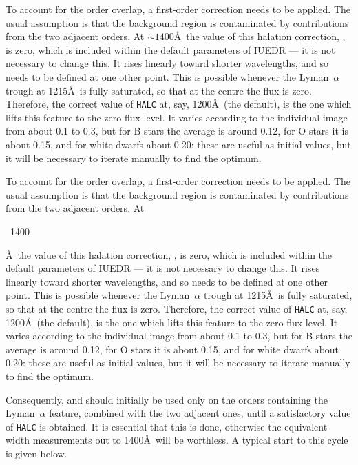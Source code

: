 \begin{latexonly}
To account for the order overlap, a first-order correction needs to be applied.
The usual assumption is that the background region is contaminated by
contributions from the two adjacent orders. At $\sim 1400$\AA\ the value of
this halation correction, , is zero, which is 
included within the
default parameters of IUEDR --- it is not necessary to change this.
It rises linearly toward shorter wavelengths, and so needs to be defined at
one other point.  This is possible whenever the Lyman~$\alpha$ trough at
1215\AA\ is fully saturated, so that at the centre the flux is zero.
Therefore, the correct value of \verb+HALC+ at, say, 1200\AA\ (the default),
is the one which lifts this feature to the zero flux level. It varies
according to the individual image from about 0.1 to 0.3, but for B stars the
average is around 0.12, for O stars it is about 0.15, and for white dwarfs
about 0.20: these are useful as initial values, but it will be necessary to
iterate manually to find the optimum.
\end{latexonly}

\begin{htmlonly}
To account for the order overlap, a first-order correction needs to be applied.
The usual assumption is that the background region is contaminated by
contributions from the two adjacent orders. At
\begin{rawhtml}~1400\end{rawhtml}\AA\ the value of this halation correction,
, 
is zero, which is included within the default parameters of IUEDR
--- it is not necessary to change this. It rises linearly toward shorter
wavelengths, and so needs to be defined at one other point.  This is possible
whenever the Lyman~$\alpha$ trough at 1215\AA\ is fully saturated, so that at
the centre the flux is zero. Therefore, the correct value of \verb+HALC+ at,
say, 1200\AA\ (the default), is the one which lifts this feature to the zero
flux level. It varies according to the individual image from about 0.1 to 0.3,
but for B stars the average is around 0.12, for O stars it is about 0.15, and
for white dwarfs about 0.20: these are useful as initial values, but it will be
necessary to iterate manually to find the optimum.
\end{htmlonly}

Consequently,  and  
should initially be used only on
the orders containing the Lyman~$\alpha$ feature, combined with the two
adjacent ones, until a satisfactory value of \verb+HALC+ is obtained.  It is
essential that this is done, otherwise the equivalent width measurements out
to 1400\AA\ will be worthless.  A typical start to this cycle is given below.

